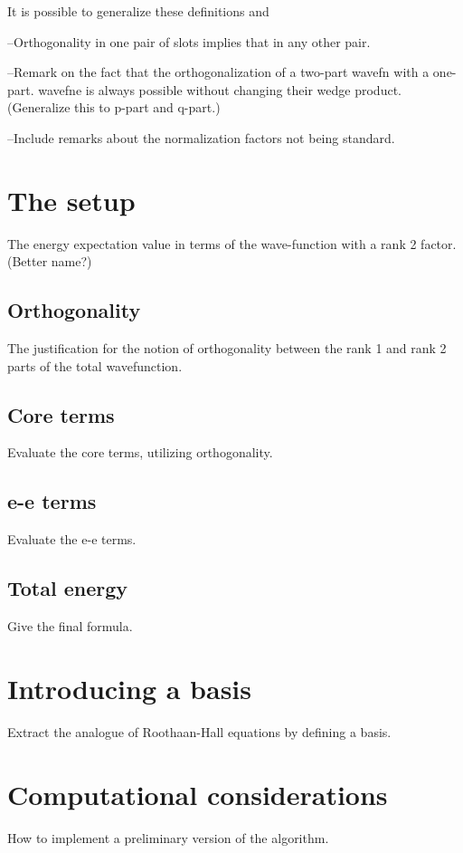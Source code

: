 \documentclass[11pt]{article}
\begin{document}
It is possible to generalize these definitions and 

--Orthogonality in one pair of slots implies that in any other pair.

--Remark on the fact that the orthogonalization of a two-part wavefn
  with a one-part. wavefne is always possible without changing their wedge
  product. (Generalize this to p-part and q-part.)

--Include remarks about the normalization factors not being standard.

\section{The setup}

The energy expectation value in terms of the wave-function with a rank 2
factor. (Better name?)


\subsection{Orthogonality}

The justification for the notion of orthogonality between the rank 1
and rank 2 parts of the total wavefunction.

\subsection{Core terms}

Evaluate the core terms, utilizing orthogonality.

\subsection{e-e terms}

Evaluate the e-e terms. 

\subsection{Total energy}

Give the final formula.

\section{Introducing a basis}

Extract the analogue of Roothaan-Hall equations by defining a basis. 

\section{Computational considerations}

How to implement a preliminary version of the algorithm.
\end{document}
